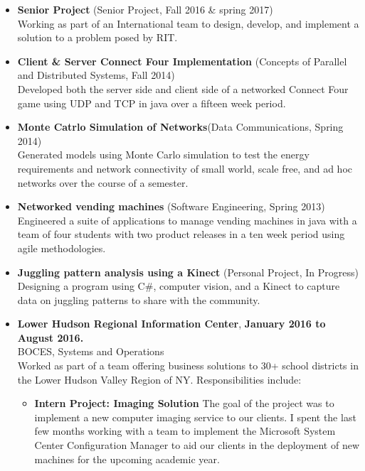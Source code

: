 \documentclass[10pt]{article}
\begin{document}
\begin{itemize}[topsep=1ex, itemsep=1ex, partopsep=0ex, parsep=0ex]
		\item[] {\bf Senior Project} (Senior Project, Fall 2016 \& spring 2017)\\
		Working as part of an International team to design, develop, and implement a solution to a problem posed by RIT. 	
    	\item[] {\bf Client \& Server Connect Four Implementation} (Concepts of Parallel and Distributed Systems, Fall 2014)\\
    	Developed both the server side and client side of a networked Connect Four game using UDP and TCP in java over a fifteen week period.
	\item[] {\bf Monte Catrlo Simulation of Networks}(Data Communications, Spring 2014)\\
	Generated models using Monte Carlo simulation to test the energy requirements and network connectivity of small world, scale free, and ad hoc networks over the course of a semester.
	\item[] {\bf Networked vending machines} (Software Engineering, Spring 2013)\\
	Engineered a suite of applications to manage vending machines in java with a team of four students with two product releases in a ten week period using agile methodologies.
	\item[] {\bf Juggling pattern analysis using a Kinect} (Personal Project, In Progress)\\
    	Designing a program using C\#, computer vision, and a Kinect to capture data on juggling patterns to share with the community.
\end{itemize}
\vspace{.5ex}
\begin{itemize}[topsep=1ex, itemsep=1ex, partopsep=0ex, parsep=0ex]
	\item[] {{\bf Lower Hudson Regional Information Center}, \hfill {\bf January 2016 to August 2016.}}\\
	BOCES, Systems and Operations\\
	Worked as part of a team offering business solutions to 30+ school districts in the Lower Hudson Valley Region of NY. Responsibilities include:
	\begin{itemize} [topsep=.5ex, itemsep=.25ex, partopsep=0ex, parsep=.5ex]
		\item[] {\bf Intern Project: Imaging Solution}
		The goal of the project was to implement a new computer imaging service to our clients. I spent the last few months working with a team to implement the Microsoft System Center Configuration Manager to aid our clients in the deployment of new machines for the upcoming academic year. 
	\end{itemize}
\end{itemize}
\end{document}
